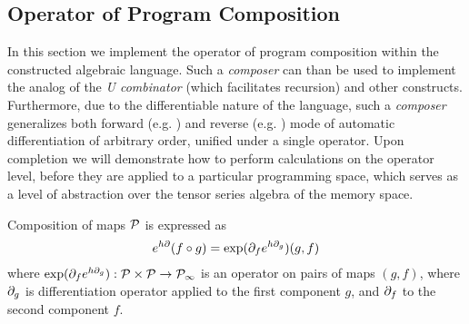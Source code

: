 


\subsection{Operator of Program Composition}\label{sec:compsition}

In this section we implement the operator of program composition within the constructed algebraic language. Such a \emph{composer} can than be used to implement the analog of the \emph{U combinator} (which facilitates recursion) and other constructs. Furthermore, due to the differentiable nature of the language, such a \emph{composer} generalizes both forward (e.g. \cite{PcAD}) and reverse (e.g. \cite{ReverseAD}) mode of
 automatic differentiation of arbitrary order, unified under a single operator. Upon completion we will demonstrate how to perform calculations on the operator level, before they are applied to a particular programming space, which serves as a level of abstraction over the tensor series algebra of the memory space.
 
 \begin{theorem}\label{izr:kompo}
 Composition of maps $\mathcal{P}$ is expressed as
 \begin{equation}\label{eq:kompo}
 e^{h\partial}(f\circ g)=\exp(\partial_fe^{h\partial_g})(g,f)
 \end{equation}
 where $\exp(\partial_fe^{h\partial_g}):\mathcal{P}\times\mathcal{P}\to\mathcal{P}_\infty$ is an operator on pairs
 of maps $(g,f)$, where $\partial_g$ is differentiation operator applied to the first
 component $g$, and $\partial_f$ to the second component $f$. 
 \end{theorem}
 
